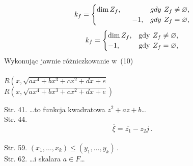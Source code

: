 \documentclass[a4paper,11pt]{article}
\numberwithin{equation}{section}
\begin{document}
\VerSpaceTwo


\noindent
{} \\
\Jest
\begin{equation*}
  k_{ f } =
  \begin{cases}
    \dim Z_{ f }, & gdy\:\, Z_{ f } \neq \oldemptyset, \\
    \quad \quad \quad \quad \quad -1, & gdy\:\, Z_{ f } = \oldemptyset,
  \end{cases}
\end{equation*}
\PowinnoByc
\begin{equation*}
  k_{ f }
  =
  \begin{cases}
    \dim Z_{ f }, & \textrm{gdy}\:\, Z_{ f } \neq \oldemptyset, \\
    -1, & \textrm{gdy}\:\, Z_{ f } = \oldemptyset,
  \end{cases}
\end{equation*}
\PowinnoByc  Wykonując jawnie różniczkowanie w~(10) \\
 \\
\Jest
$R\left( x, \sqrt{ a x^{ 4 } + b x^{ 3 } + c x^{ 2 } + d x + e }
\right.$ \\
\PowinnoByc
$R\left( x, \sqrt{ a x^{ 4 } + b x^{ 3 } + c x^{ 2 } + d x + e }
\right)$ \\

\VerSpaceTwo


Str. 41. \ldots to funkcja kwadratowa $z^2+az+b$\ldots \\
Str. 44.
  $$\overline{ \xi } = \overline{ z_{ 1 } } - z_{ 2 } j \, .$$ \\
Str. 59. $( x_{ 1 }, \ldots, x_{ k } ) \leq ( y_{ 1 }, \ldots, y_{ k } ) \, .$ \\
Str. 62. \ldots i skalara $a \in F$\ldots \\
\end{document}
